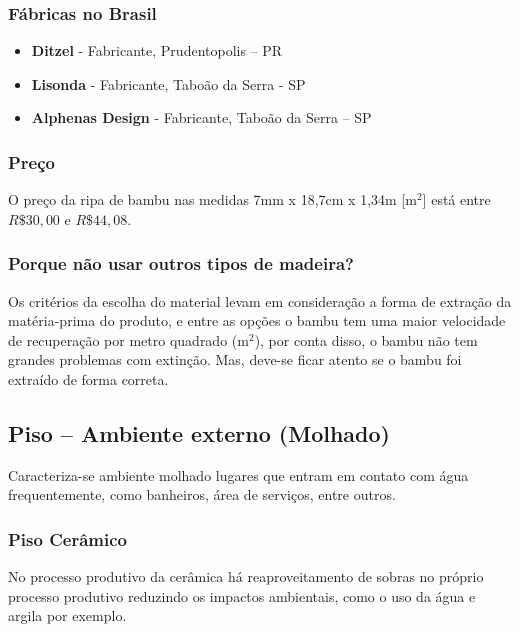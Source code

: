 \subsubsection*{\textbf{Fábricas no Brasil}}

	\begin{itemize}

		\item \textbf{Ditzel} - Fabricante, Prudentopolis – PR

		\item \textbf{Lisonda} - Fabricante, Taboão da Serra - SP

		\item \textbf{Alphenas Design} - Fabricante, Taboão da Serra – SP

	\end{itemize}

\subsubsection*{\textbf{Preço}}

	O preço da ripa de bambu nas medidas 7mm x 18,7cm x 1,34m [$\si{\meter}^2$] está entre $R\$ 30,00$ e $R\$ 44,08$.

\subsubsection*{\textbf{Porque não usar outros tipos de madeira?}}
	
        Os critérios da escolha do material levam em consideração a forma de extração da matéria-prima do produto, e entre as opções o bambu tem uma maior velocidade de recuperação por metro quadrado (\si{\meter}$^2$), por conta disso, o bambu não tem grandes problemas com extinção. Mas, deve-se ficar atento se o bambu foi extraído de forma correta.

\subsection{Piso – Ambiente externo (Molhado)}

        Caracteriza-se ambiente molhado lugares que entram em contato com água frequentemente, como banheiros, área de serviços, entre outros.

\subsubsection*{\textbf{Piso Cerâmico}}

	No processo produtivo da cerâmica há reaproveitamento de sobras no próprio processo produtivo reduzindo os impactos ambientais, como o uso da água e argila por exemplo.

